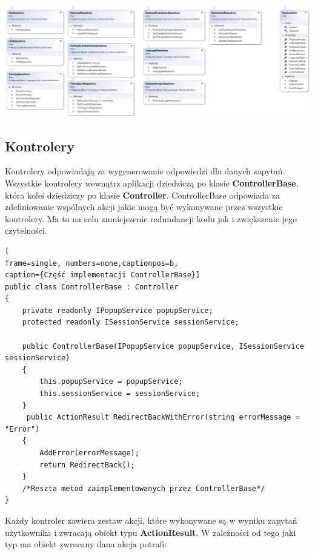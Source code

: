 \begin{landscape}
\begin{center}
	\includegraphics[width=\textwidth]{images/Repos.png}
\end{center}
\end{landscape}


\subsection{Kontrolery}

Kontrolery odpowiadają za wygenerowanie odpowiedzi dla danych zapytań. Wszystkie kontrolery wewnątrz aplikacji dziedziczą po klasie \textbf{ControllerBase}, która kolei dziedziczy po klasie \textbf{Controller}. ControllerBase odpowiada za zdefiniowanie wspólnych akcji jakie mogą być wykonywane przez wszystkie kontrolery. Ma to na celu zmniejszenie redundancji kodu jak i zwiększenie jego czytelności.

\begin{minipage}{\linewidth}
\begin{lstlisting}[
frame=single, numbers=none,captionpos=b, 
caption={Część implementacji ControllerBase}]
public class ControllerBase : Controller
{
	private readonly IPopupService popupService;
	protected readonly ISessionService sessionService;

	public ControllerBase(IPopupService popupService, ISessionService sessionService)
	{
		this.popupService = popupService;
		this.sessionService = sessionService;
	}
	 public ActionResult RedirectBackWithError(string errorMessage = "Error")
	{
		AddError(errorMessage);
		return RedirectBack();
	}
	/*Reszta metod zaimplementowanych przez ControllerBase*/
}
\end{lstlisting}
\end{minipage}

Każdy kontroler zawiera zestaw akcji, które wykonywane są w wyniku zapytań użytkownika i zwracają obiekt typu \textbf{ActionResult}. W zależności od tego jaki typ ma obiekt zwracany dana akcja potrafi:

